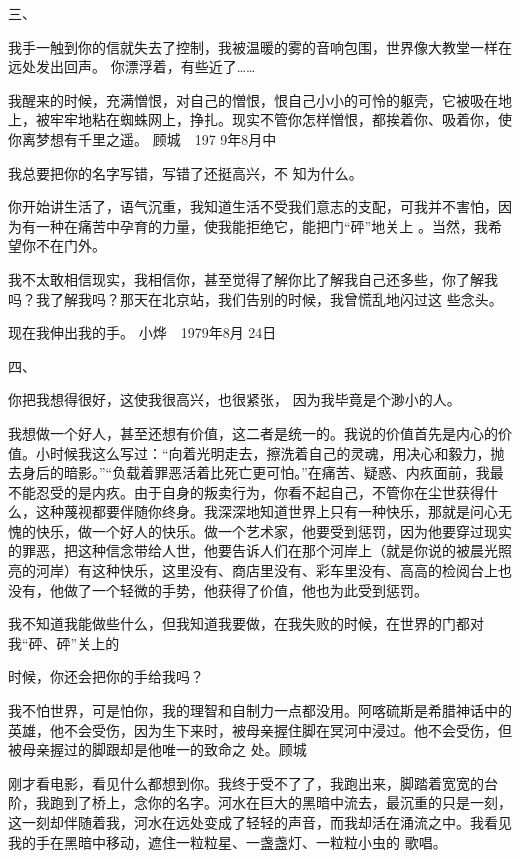\documentclass{article}
\begin{document}
三、 



我手一触到你的信就失去了控制，我被温暖的雾的音响包围，世界像大教堂一样在远处发出回声。
你漂浮着，有些近了…… 

我醒来的时候，充满憎恨，对自己的憎恨，恨自己小小的可怜的躯壳，它被吸在地上，被牢牢地粘在蜘蛛网上，挣扎。现实不管你怎样憎恨，都挨着你、吸着你，使你离梦想有千里之遥。 顾城　197
9年8月中 


\newpage


我总要把你的名字写错，写错了还挺高兴，不
知为什么。 

你开始讲生活了，语气沉重，我知道生活不受我们意志的支配，可我并不害怕，因为有一种在痛苦中孕育的力量，使我能拒绝它，能把门“砰”地关上
。当然，我希望你不在门外。 

我不太敢相信现实，我相信你，甚至觉得了解你比了解我自己还多些，你了解我吗？我了解我吗？那天在北京站，我们告别的时候，我曾慌乱地闪过这
些念头。 

现在我伸出我的手。 小烨　1979年8月
24日 


四、 



\newpage

你把我想得很好，这使我很高兴，也很紧张，
因为我毕竟是个渺小的人。 

我想做一个好人，甚至还想有价值，这二者是统一的。我说的价值首先是内心的价值。小时候我这么写过：“向着光明走去，擦洗着自己的灵魂，用决心和毅力，抛去身后的暗影。”“负载着罪恶活着比死亡更可怕。”在痛苦、疑惑、内疚面前，我最不能忍受的是内疚。由于自身的叛卖行为，你看不起自己，不管你在尘世获得什么，这种蔑视都要伴随你终身。我深深地知道世界上只有一种快乐，那就是问心无愧的快乐，做一个好人的快乐。做一个艺术家，他要受到惩罚，因为他要穿过现实的罪恶，把这种信念带给人世，他要告诉人们在那个河岸上（就是你说的被晨光照亮的河岸）有这种快乐，这里没有、商店里没有、彩车里没有、高高的检阅台上也没有，他做了一个轻微的手势，他获得了价值，他也为此受到惩罚。

我不知道我能做些什么，但我知道我要做，在我失败的时候，在世界的门都对我“砰、砰”关上的

\newpage
时候，你还会把你的手给我吗？ 

我不怕世界，可是怕你，我的理智和自制力一点都没用。阿喀硫斯是希腊神话中的英雄，他不会受伤，因为生下来时，被母亲握住脚在冥河中浸过。他不会受伤，但被母亲握过的脚跟却是他唯一的致命之
处。顾城 



刚才看电影，看见什么都想到你。我终于受不了了，我跑出来，脚踏着宽宽的台阶，我跑到了桥上，念你的名字。河水在巨大的黑暗中流去，最沉重的只是一刻，这一刻却伴随着我，河水在远处变成了轻轻的声音，而我却活在涌流之中。我看见我的手在黑暗中移动，遮住一粒粒星、一盏盏灯、一粒粒小虫的
歌唱。 
\end{document}

